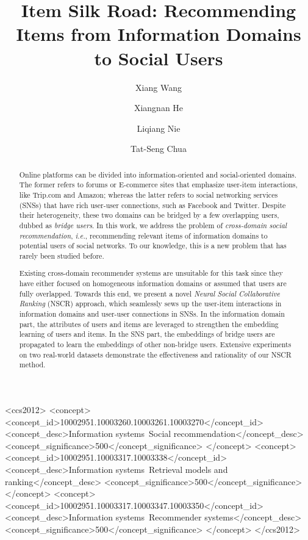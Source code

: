 \documentclass[sigconf]{acmart}
\begin{document}
\title{Item Silk Road: Recommending Items from Information Domains to Social Users}

\author{Xiang Wang}

\author{Xiangnan He}

\author{Liqiang Nie}

\author{Tat-Seng Chua}


\begin{abstract}
Online platforms can be divided into information-oriented and social-oriented domains. The former refers to forums or E-commerce sites that emphasize user-item interactions, like Trip.com and Amazon; whereas the latter refers to social networking services (SNSs) that have rich user-user connections, such as Facebook and Twitter.
Despite their heterogeneity, these two domains can be bridged by a few overlapping users, dubbed as \emph{bridge users}.
In this work, we address the problem of \textit{cross-domain social recommendation}, \emph{i.e.}, recommending relevant items of information domains to potential users of social networks.
To our knowledge, this is a new problem that has rarely been studied before.

Existing cross-domain recommender systems are unsuitable for this task since they have either focused on homogeneous information domains or assumed that users are fully overlapped. Towards this end, we present a novel \emph{Neural Social Collaborative Ranking} (NSCR) approach, which seamlessly sews up the user-item interactions in information domains and user-user connections in SNSs.
In the information domain part, the attributes of users and items are leveraged to strengthen the embedding learning of users and items. In the SNS part, the embeddings of bridge users are propagated to learn the embeddings of other non-bridge users. Extensive experiments on two real-world datasets demonstrate the effectiveness and rationality of our NSCR method.
\end{abstract} \vspace{-5pt}

\begin{CCSXML}
<ccs2012>
<concept>
<concept_id>10002951.10003260.10003261.10003270</concept_id>
<concept_desc>Information systems~Social recommendation</concept_desc> <concept_significance>500</concept_significance>
</concept>
<concept>
<concept_id>10002951.10003317.10003338</concept_id>
<concept_desc>Information systems~Retrieval models and ranking</concept_desc> <concept_significance>500</concept_significance>
</concept>
<concept>
<concept_id>10002951.10003317.10003347.10003350</concept_id>
<concept_desc>Information systems~Recommender systems</concept_desc> <concept_significance>500</concept_significance>
</concept>
</ccs2012>
\end{CCSXML}
\end{document}
